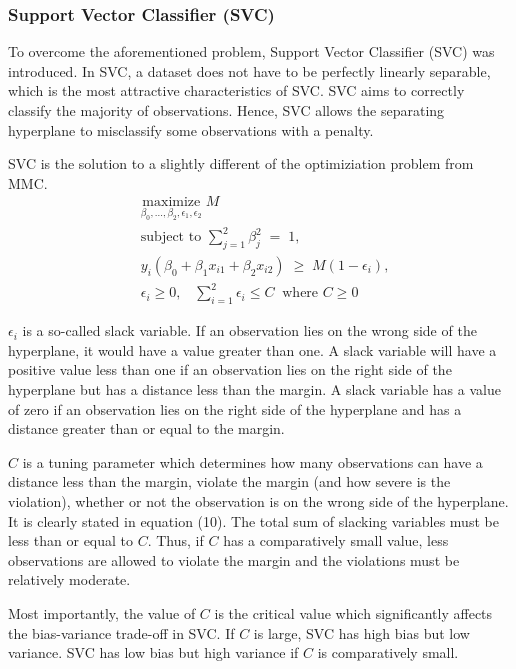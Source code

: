 \documentclass[11pt,a4paper,oneside]{article}
\begin{document}
\subsubsection{Support Vector Classifier (SVC)}
To overcome the aforementioned problem, Support Vector Classifier (SVC) was introduced. In SVC, a dataset does not have to be perfectly linearly separable, which is the most attractive characteristics of SVC. SVC aims to correctly classify the majority of observations. Hence, SVC allows the separating hyperplane to misclassify some observations with a penalty. 
\par
SVC is the solution to a slightly different of the optimiziation problem from MMC.
\begin{align}
	&\underset{\beta_{0}, ..., \beta_{2}, \epsilon_{1}, \epsilon_{2}}{\text{maximize}}\; M\\
	&\text{subject to }\sum^{2}_{j=1}\beta^{2}_{j}\;=\;1,\\
	&y_{i}(\beta_{0}+\beta_{1}x_{i1}+\beta_{2}x_{i2}) \; \geq\; M(1-\epsilon_{i}),\\
	&\epsilon_{i} \geq 0, \;\;\; \sum^{2}_{i=1}\epsilon_{i}\leq C \;\;\text{where } C\geq0 
\end{align}
\par
$\epsilon_{i}$ is a so-called slack variable. If an observation lies on the wrong side of the hyperplane, it would have a value greater than one. A slack variable will have a positive value less than one if an observation lies on the right side of the hyperplane but has a distance less than the margin. A slack variable has a value of zero if an observation lies on the right side of the hyperplane and has a distance greater than or equal to the margin.
\par
$C$ is a tuning parameter which determines how many observations can have a distance less than the margin, violate the margin (and how severe is the violation), whether or not the observation is on the wrong side of the hyperplane. It is clearly stated in equation (10). The total sum of slacking variables must be less than or equal to $C$. Thus, if $C$ has a comparatively small value, less observations are allowed to violate the margin and the violations must be relatively moderate. 
\par
Most importantly, the value of $C$ is the critical value which significantly affects the bias-variance trade-off in SVC. If $C$ is large, SVC has high bias but low variance. SVC has low bias but high variance if $C$ is comparatively small.
\end{document}
